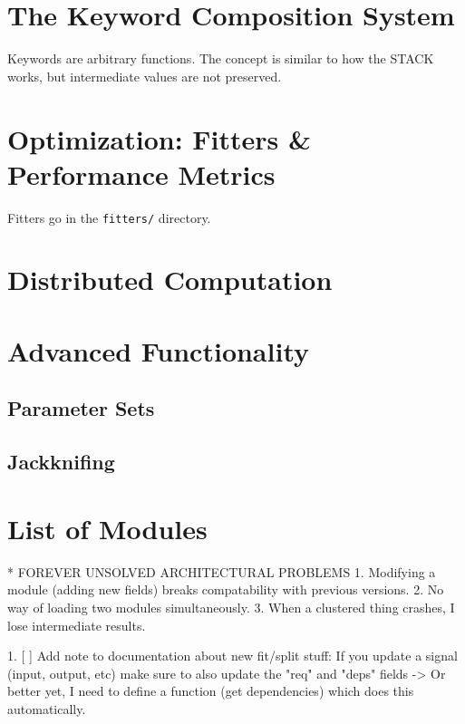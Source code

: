 \documentclass[letterpaper]{report}
\newcommand{\matlab}[1]{\texttt{#1}}
\begin{document}
\chapter{The Keyword Composition System}

Keywords are arbitrary functions. The concept is similar to how the STACK works, but intermediate values are not preserved. 

\chapter{Optimization: Fitters \& Performance Metrics}

Fitters go in the \matlab{fitters/} directory. 

\chapter{Distributed Computation}

\chapter{Advanced Functionality}

\section{Parameter Sets}

\section{Jackknifing}



\chapter{List of Modules}

* FOREVER UNSOLVED ARCHITECTURAL PROBLEMS
  1. Modifying a module (adding new fields) breaks compatability with previous versions.
  2. No way of loading two modules simultaneously.
  3. When a clustered thing crashes, I lose intermediate results. 

  1. [ ] Add note to documentation about new fit/split stuff: 
     If you update a signal (input, output, etc) make sure to also update the "req" and "deps" fields 
     -> Or better yet, I need to define a function (get dependencies) which does this automatically. 
\end{document}
